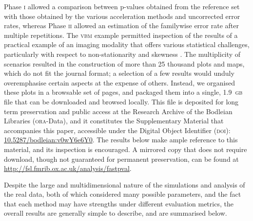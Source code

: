 Phase \textsc{i} allowed a comparison between p-values obtained from the reference set with those obtained by the various acceleration methods and uncorrected error rates, whereas Phase \textsc{ii} allowed an estimation of the familywise error rate after multiple repetitions. The \textsc{vbm} example permitted inspection of the results of a practical example of an imaging modality that offers various statistical challenges, particularly with respect to non-stationarity \citep{Hayasaka2004, Salimi-Khorshidi2011} and skewness \citep{Salmond2002, Viviani2007}. The multiplicity of scenarios resulted in the construction of more than 25 thousand plots and maps, which do not fit the journal format; a selection of a few results would unduly overemphasise certain aspects at the expense of others. Instead, we organised these plots in a browsable set of pages, and packaged them into a single, 1.9~\textsc{gb} file that can be downloaded and browsed locally. This file is deposited for long term preservation and public access at the Research Archive of the Bodleian Libraries (\textsc{ora}-Data), and it constitutes the Supplementary Material that accompanies this paper, accessible under the Digital Object Identifier (\textsc{doi}): \href{http://dx.doi.org/10.5287/bodleian:v0wY6e6Y0}{10.5287/bodleian:v0wY6e6Y0}. The results below make ample reference to this material, and its inspection is encouraged. A mirrored copy that does not require download, though not guaranteed for permanent preservation, can be found at \href{http://fsl.fmrib.ox.ac.uk/analysis/fastpval}{http://fsl.fmrib.ox.ac.uk/analysis/fastpval}.

Despite the large and multidimensional nature of the simulations and analysis of the real data, both of which considered many possible parameters, and the fact that each method may have strengths under different evaluation metrics, the overall results are generally simple to describe, and are summarised below.

